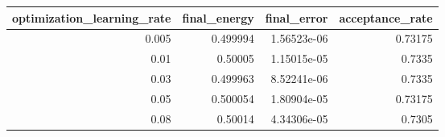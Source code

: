 \begin{tabular}{rrrr}
\toprule
optimization_learning_rate & final_energy & final_error & acceptance_rate \\
\midrule
0.005 & 0.499994 & 1.56523e-06 & 0.73175 \\
0.01 & 0.50005 & 1.15015e-05 & 0.7335 \\
0.03 & 0.499963 & 8.52241e-06 & 0.7335 \\
0.05 & 0.500054 & 1.80904e-05 & 0.73175 \\
0.08 & 0.50014 & 4.34306e-05 & 0.7305 \\
\bottomrule
\end{tabular}
